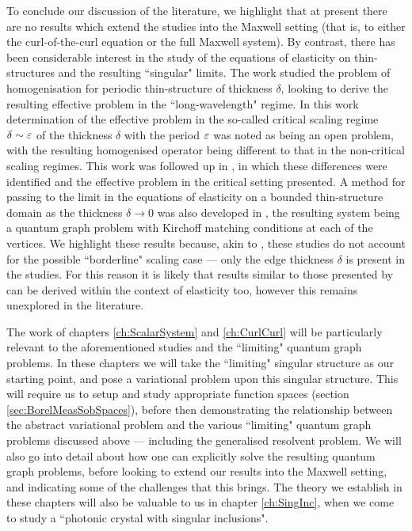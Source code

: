 To conclude our discussion of the literature, we highlight that at present there are no results which extend the studies \cite{kuchment2001convergence, kuchment2003asymptotics, exner2005convergence} into the Maxwell setting (that is, to either the curl-of-the-curl equation or the full Maxwell system).
By contrast, there has been considerable interest in the study of the equations of elasticity on thin-structures and the resulting ``singular" limits.
The work \cite{zhikov2002homogenization} studied the problem of homogenisation for periodic thin-structure of thickness $\delta$, looking to derive the resulting effective problem in the ``long-wavelength" regime.
In this work determination of the effective problem in the so-called critical scaling regime $\delta\sim\varepsilon$ of the thickness $\delta$ with the period $\varepsilon$ was noted as being an open problem, with the resulting homogenised operator being different to that in the non-critical scaling regimes.
This work was followed up in \cite{zhikov2003homogenization}, in which these differences were identified and the effective problem in the critical setting presented.
A method for passing to the limit in the equations of elasticity on a bounded thin-structure domain as the thickness $\delta\rightarrow0$ was also developed in \cite{zhikov2006derivation}, the resulting system being a quantum graph problem with Kirchoff matching conditions at each of the vertices.
We highlight these results because, akin to \cite{kuchment2001convergence}, these studies do not account for the possible ``borderline" scaling case --- only the edge thickness $\delta$ is present in the studies.
For this reason it is likely that results similar to those presented by \cite{exner2005convergence} can be derived within the context of elasticity too, however this remains unexplored in the literature.

The work of chapters \ref{ch:ScalarSystem} and \ref{ch:CurlCurl} will be particularly relevant to the aforementioned studies and the ``limiting" quantum graph problems.
In these chapters we will take the ``limiting" singular structure as our starting point, and pose a variational problem upon this singular structure.
This will require us to setup and study appropriate function spaces (section \ref{sec:BorelMeasSobSpaces}), before then demonstrating the relationship between the abstract variational problem and the various ``limiting" quantum graph problems discussed above --- including the generalised resolvent problem.
We will also go into detail about how one can explicitly solve the resulting quantum graph problems, before looking to extend our results into the Maxwell setting, and indicating some of the challenges that this brings.
The theory we establish in these chapters will also be valuable to us in chapter \ref{ch:SingInc}, when we come to study a ``photonic crystal with singular inclusions".